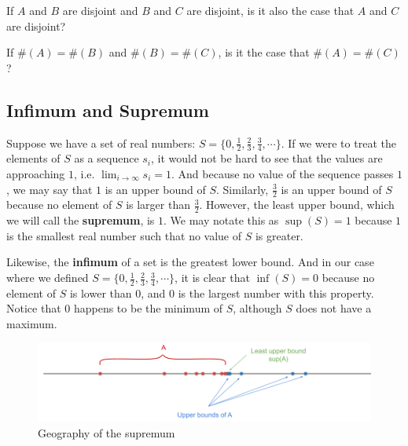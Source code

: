 \begin{exercise}
    If $A$ and $B$ are disjoint and $B$ and $C$ are disjoint, is it also the case that $A$ and $C$ are disjoint?
\end{exercise}
    \vspace{-4mm}

\begin{exercise}
    If $\#(A)=\#(B)$ and $\#(B)=\#(C)$, is it the case that $\#(A)=\#(C)$?
\end{exercise}

\subsection{Infimum and Supremum}

Suppose we have a set of real numbers: $S=\{0,\frac{1}{2},\frac{2}{3},\frac{3}{4},\cdots\}$. If we were to treat the elements of $S$ as a sequence $s_i$, it would not be hard to see that the values are approaching $1$, i.e. $\lim_{i\to\infty}s_i=1$. And because no value of the sequence passes $1$, we may say that $1$ is an upper bound of $S$. Similarly, $\frac{3}{2}$ is an upper bound of $S$ because no element of $S$ is larger than $\frac{3}{2}$. However, the least upper bound, which we will call the \textbf{supremum}, is $1$. We may notate this as $\sup(S)=1$ because $1$ is the smallest real number such that no value of $S$ is greater. \par

Likewise, the \textbf{infimum} of a set is the greatest lower bound. And in our case where we defined $S=\{0,\frac{1}{2},\frac{2}{3},\frac{3}{4},\cdots\}$, it is clear that $\inf(S)=0$ because no element of $S$ is lower than $0$, and $0$ is the largest number with this property. Notice that $0$ happens to be the minimum of $S$, although $S$ does not have a maximum. 


\begin{figure}[H]
\centering
\includegraphics[scale=0.4]{Images/Chap0/0sup.png}
\caption{Geography of the supremum}\label{visina8}
\end{figure}


\clearpage


